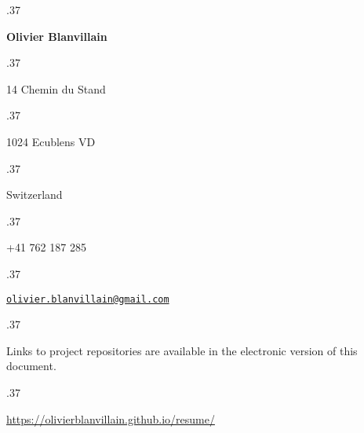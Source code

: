 \documentclass[margin, a4paper]{res}
\let\link\href
\renewcommand{\href}[2]{\link{#1}{\scriptsize{\faExternalLink}}}
\newcommand{\centered}[1]{\moveleft.37\hoffset\centerline{#1}}
\begin{document}
  \centered{\large\textbf{Olivier Blanvillain}}
  \vspace{3pt}
  \centered{14 Chemin du Stand}
  \centered{1024 Ecublens VD}
  \centered{Switzerland}
  \vspace{3pt}
  \centered{+41 762 187 285}
  \centered{\link{mailto:olivier.blanvillain@gmail.com}{\texttt{olivier.blanvillain@gmail.com}}}

  \begin{resume}
    
  \end{resume}

  \vspace{25pt}

  \centered{\footnotesize Links to project repositories are available in the electronic version of this document.}
  \centered{\footnotesize \url{https://olivierblanvillain.github.io/resume/}}
\end{document}
